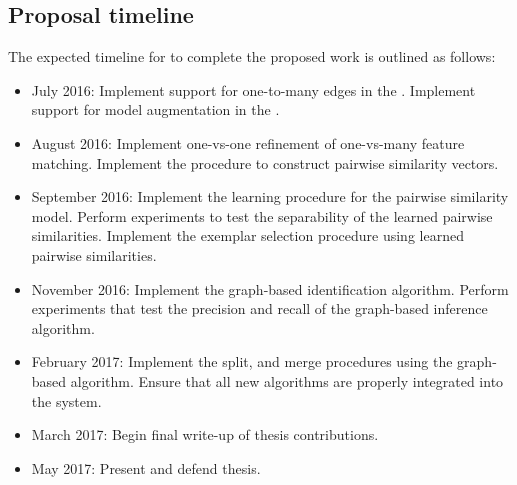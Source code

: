     \subsection{Proposal timeline}
    The expected timeline for to complete the proposed work is outlined as
      follows:
    \begin{itemize}

        \item July 2016:
        Implement support for one-to-many edges in the \depcache{}.
        Implement support for model augmentation in the \depcache{}.

        \item August 2016:
        Implement one-vs-one refinement of one-vs-many feature matching.
        Implement the procedure to construct pairwise similarity vectors.

        \item September 2016:
        Implement the learning procedure for the pairwise similarity model.
        Perform experiments to test the separability of the learned pairwise
          similarities.
        Implement the exemplar selection procedure using learned pairwise
          similarities.

        \item November 2016:
        Implement the graph-based identification algorithm.
        Perform experiments that test the precision and recall of the
          graph-based inference algorithm.

        \item February 2017:
        Implement the split, and merge procedures using the graph-based
          algorithm.
        Ensure that all new algorithms are properly integrated into the
          system.

        \item March 2017:
        Begin final write-up of thesis contributions.

        \item May 2017:
        Present and defend thesis.

    \end{itemize}



